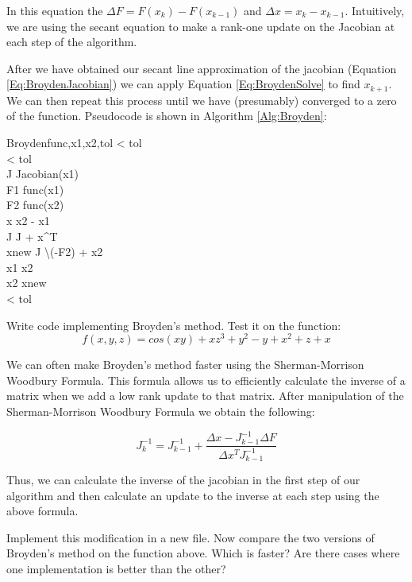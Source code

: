 In this equation the $\Delta F = F(x_k)-F(x_{k-1})$ and $\Delta x = x_k-x_{k-1}$. Intuitively, we are using the secant equation to make a rank-one update on the Jacobian at each step of the algorithm.

After we have obtained our secant line approximation of the jacobian (Equation \ref{Eq:BroydenJacobian}) we can apply Equation \ref{Eq:BroydenSolve} to find $x_{k+1}$. We can then repeat this process until we have (presumably) converged to a zero of the function. Pseudocode is shown in Algorithm \ref{Alg:Broyden}:

\begin{pseudo}{Broyden}{func,x1,x2,tol}
\label{Alg:Broyden}
\IF {} < tol \THEN
    \\
\IF {} < tol \THEN
    \\

J \GETS Jacobian(x1) \\

\REPEAT 
F1 \GETS func(x1) \\
F2 \GETS func(x2) \\
\Delta x \GETS x2 - x1 \\
J \GETS J + \Delta x^T \\
xnew \GETS J \backslash (-F2) + x2 \\
x1 \GETS x2 \\
x2 \GETS xnew \\
\UNTIL {} < tol \THEN {}
\end{pseudo}

\begin{problem}
Write code implementing Broyden's method. Test it on the function:
\[
f(x,y,z) = cos(xy) + xz^3 + y^2 - y + x^2 + z + x
\]
\end{problem}

We can often make Broyden's method faster using the Sherman-Morrison Woodbury Formula. This formula allows us to efficiently calculate the inverse of a matrix when we add a low rank update to that matrix. After manipulation of the Sherman-Morrison Woodbury Formula we obtain the following:

\[
J_k^{-1} = J_{k-1}^{-1} + \frac{\Delta x - J_{k-1}^{-1}\Delta F}{\Delta x^T J_{k-1}^{-1}}
\]

Thus, we can calculate the inverse of the jacobian in the first step of our algorithm and then calculate an update to the inverse at each step using the above formula.

\begin{problem}
Implement this modification in a new file. Now compare the two versions of Broyden's method on the function above. Which is faster? Are there cases where one implementation is better than the other?
\end{problem}
